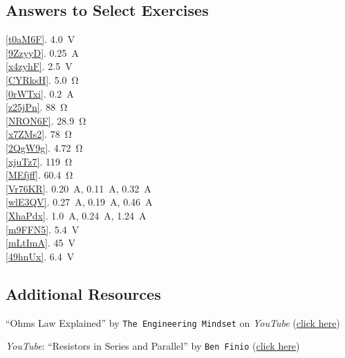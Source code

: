 \documentclass[main.tex]{subfiles}
\begin{document}
\clearpage
\subsection*{Answers to Select Exercises}

\ref{t0aM6F}. \SI{4.0}{V}\\
\ref{9ZzyyD}. \SI{0.25}{A}\\
\ref{x4zyhF}. \SI{2.5}{V}\\
\ref{CYRksH}. \SI{5.0}{\ohm}\\
\ref{0rWTxi}. \SI{0.2}{A}\\
\ref{z25jPn}. \SI{88}{\ohm}\\
\ref{NRON6F}. \SI{28.9}{\ohm}\\
\ref{x7ZMs2}. \SI{78}{\ohm}\\
\ref{2QgW9g}. \SI{4.72}{\ohm}\\
\ref{xjuTz7}. \SI{119}{\ohm}\\
\ref{MEfjff}. \SI{60.4}{\ohm}\\
\ref{Vr76KR}. \SI{0.20}{A}, \SI{0.11}{A}, \SI{0.32}{A}\\ 
\ref{wlE3QV}. \SI{0.27}{A}, \SI{0.19}{A}, \SI{0.46}{A}\\ 
\ref{XhaPdx}. \SI{1.0}{A}, \SI{0.24}{A}, \SI{1.24}{A}\\ 
\ref{m9FFN5}. \SI{5.4}{V}\\
\ref{mLtImA}. \SI{45}{V}\\
\ref{49hnUx}. \SI{6.4}{V}\\


\subsection*{Additional Resources}

``Ohms Law Explained'' by \texttt{The Engineering Mindset} on \textit{YouTube} (\href{https://youtu.be/HsLLq6Rm5tU}{click here})

\textit{YouTube}: ``Resistors in Series and Parallel'' by \texttt{Ben Finio} 
(\href{https://youtu.be/bTnQUZ4Hi-E}{click here})

\clearpage
\printnoidxglossaries
\end{document}
